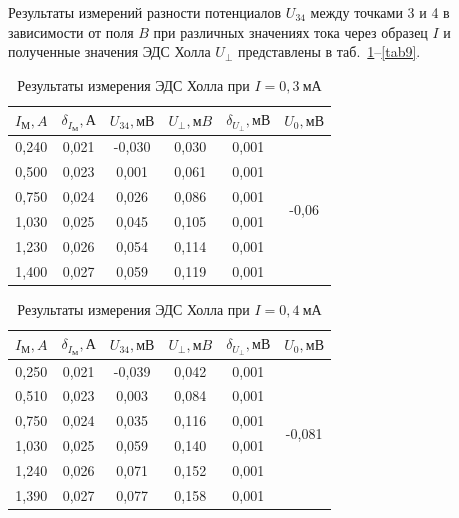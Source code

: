 \documentclass[a4paper, 12pt]{article}
\begin{document}
\newpage

Результаты измерений разности потенциалов $U_{34}$ между точками 3 и 4 в зависимости от поля $B$ при различных значениях тока через образец $I$ и полученные значения ЭДС Холла $U_{\perp}$ представлены в таб.~\ref{tab2}--\ref{tab9}.

\begin{table}[h!]
\begin{center}
\begin{tabular}{|c|c|c|c|c|c|}
\hline
$I_М, A$  & $\delta_{I_М}, А$ & $U_{34}, мВ$ & $U_{\perp}, мB$ & $\delta_{U_{\perp}}, мВ$ & $U_0, мВ$                     \\ \hline
0,240 & 0,021 & -0,030  & 0,030    & 0,001  & \multirow{6}{*}{-0,06} \\ \cline{1-5}
0,500 & 0,023 & 0,001   & 0,061    & 0,001  &                        \\ \cline{1-5}
0,750 & 0,024 & 0,026   & 0,086    & 0,001  &                        \\ \cline{1-5}
1,030 & 0,025 & 0,045   & 0,105    & 0,001  &                        \\ \cline{1-5}
1,230 & 0,026 & 0,054   & 0,114    & 0,001  &                        \\ \cline{1-5}
1,400 & 0,027 & 0,059   & 0,119    & 0,001  &                        \\ \hline
\end{tabular}
\end{center}
\caption{Результаты измерения ЭДС Холла при $I = 0,3~мА$}
\label{tab2}
\end{table}

\begin{table}[h!]
\begin{center}
\begin{tabular}{|c|c|c|c|c|c|}
\hline
$I_М, A$  & $\delta_{I_М}, А$ & $U_{34}, мВ$ & $U_{\perp}, мB$ & $\delta_{U_{\perp}}, мВ$ & $U_0, мВ$                     \\ \hline
0,250 & 0,021 & -0,039  & 0,042    & 0,001  & \multirow{6}{*}{-0,081} \\ \cline{1-5}
0,510 & 0,023 & 0,003   & 0,084    & 0,001  &                         \\ \cline{1-5}
0,750 & 0,024 & 0,035   & 0,116    & 0,001  &                         \\ \cline{1-5}
1,030 & 0,025 & 0,059   & 0,140    & 0,001  &                         \\ \cline{1-5}
1,240 & 0,026 & 0,071   & 0,152    & 0,001  &                         \\ \cline{1-5}
1,390 & 0,027 & 0,077   & 0,158    & 0,001  &                         \\ \hline
\end{tabular}
\end{center}
\caption{Результаты измерения ЭДС Холла при $I = 0,4~мА$}
\label{tab3}
\end{table}
\end{document}
